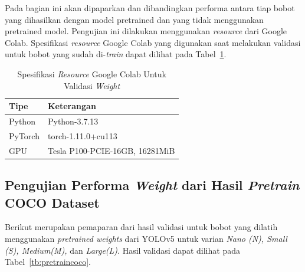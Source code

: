 \par Pada bagian ini akan dipaparkan dan dibandingkan performa antara tiap bobot yang dihasilkan 
dengan model pretrained dan yang tidak menggunakan pretrained model. Pengujian ini dilakukan menggunakan
\emph{resource} dari Google Colab. Spesifikasi \emph{resource} Google Colab yang digunakan saat melakukan validasi
untuk bobot yang sudah di-\emph{train} dapat dilihat pada Tabel~\ref{tb:spekgoogleclab}.

\begin{table}
  \centering
  \caption{Spesifikasi \emph{Resource} Google Colab Untuk Validasi \emph{Weight}}
  \label{tb:spekgoogleclab}
  \begin{tabular}{|l|l|} 
  \hline
  Tipe    & Keterangan                      \\ 
  \hline
  Python  & Python-3.7.13                   \\
  PyTorch & torch-1.11.0+cu113              \\
  GPU     & Tesla P100-PCIE-16GB, 16281MiB  \\
  \hline
  \end{tabular}
\end{table}

\subsection{Pengujian Performa \emph{Weight} dari Hasil \emph{Pretrain} COCO Dataset}
\label{subsec:ujiperforma_coco}

\par Berikut merupakan pemaparan dari hasil validasi untuk bobot yang dilatih menggunakan \emph{pretrained weights}
dari YOLOv5 untuk varian \emph{Nano (N), Small (S), Medium(M),} dan \emph{Large(L)}. Hasil validasi dapat dilihat pada
Tabel~\ref{tb:pretraincoco}.

